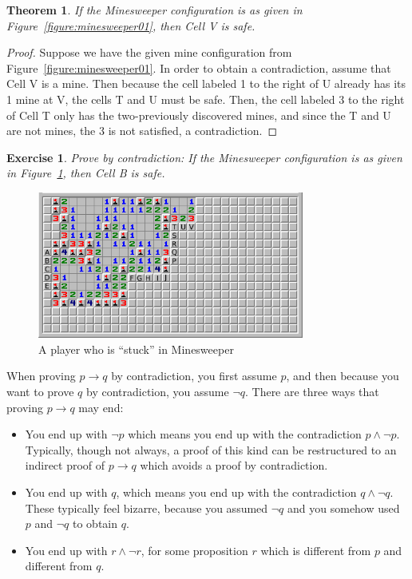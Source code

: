 \documentclass{book}
\newcounter{ekcounter}%
\theoremstyle{ekimcustom}
\newtheorem{theorem}[ekcounter]{Theorem}
\newtheorem{exercise}[ekcounter]{Exercise}
\begin{document}
\begin{theorem}\label{theorem:minesweeper01-V-safe-contradiction}
If the Minesweeper configuration is as given in Figure~\ref{figure:minesweeper01}, then Cell V is safe.
\end{theorem}
\begin{proof}
Suppose we have the given mine configuration from Figure~\ref{figure:minesweeper01}. In order to obtain a contradiction, assume that Cell V is a mine. Then because the cell labeled 1 to the right of U already has its 1 mine at V, the cells T and U must be safe. Then, the cell labeled 3 to the right of Cell T only has the two-previously discovered mines, and since the T and U are not mines, the 3 is not satisfied, a contradiction.
\end{proof}

\begin{exercise}
Prove by contradiction: If the Minesweeper configuration is as given in Figure~\ref{figure:minesweeper02}, then Cell B is safe.
\end{exercise}
\begin{figure}[hbt]
\begin{center}
\includegraphics[width=0.78\textwidth]{minesweeper02}
\end{center}
\caption{A player who is ``stuck'' in Minesweeper}\label{figure:minesweeper02}
\end{figure}

When proving $p \to q$ by contradiction, you first assume $p$, and then because you want to prove $q$ by contradiction, you assume $\neg q$. There are three ways that proving $p \to q$ may end:
\begin{itemize}
\item You end up with $\neg p$ which means you end up with the contradiction $p \wedge \neg p$. Typically, though not always, a proof of this kind can be restructured to an indirect proof of $p \to q$ which avoids a proof by contradiction.
\item You end up with $q$, which means you end up with the contradiction $q \wedge \neg q$. These typically feel bizarre, because you assumed $\neg q$ and you somehow used $p$ and $\neg q$ to obtain $q$.
\item You end up with $r \wedge \neg r$, for some proposition $r$ which is different from $p$ and different from $q$.
\end{itemize}
\end{document}
